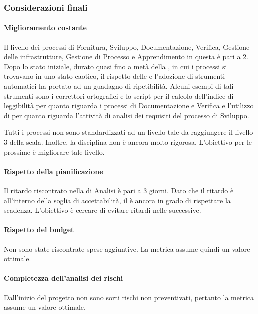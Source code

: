 		\subsubsection{Considerazioni finali}
			\paragraph{Miglioramento costante}
			\label{RMC}
				Il livello  dei processi di Fornitura, Sviluppo, Documentazione, Verifica, Gestione delle infrastrutture, Gestione di Processo e Apprendimento in questa  è pari a 2. Dopo lo stato iniziale, durato quasi fino a metà della , in cui i processi si trovavano in uno stato caotico, il rispetto delle \ndpv{} e l'adozione di strumenti automatici ha portato ad un guadagno di ripetibilità. Alcuni esempi di tali strumenti sono i correttori ortografici e lo script per il calcolo dell'indice di leggibilità per quanto riguarda i processi di Documentazione e Verifica e l'utilizzo di  per quanto riguarda l'attività di analisi dei requisiti del processo di Sviluppo.
				
				
				Tutti i processi non sono standardizzati ad un livello tale da raggiungere il livello 3 della scala. Inoltre, la disciplina non è ancora molto rigorosa. L'obiettivo per le prossime  è migliorare tale livello.
				
			\paragraph{Rispetto della pianificazione}
			\label{RRDP}
				Il ritardo riscontrato nella  di Analisi è pari a 3 giorni. Dato che il ritardo è all'interno della soglia di accettabilità, il  è ancora in grado di rispettare la scadenza. L'obiettivo è cercare di evitare ritardi nelle  successive.
			
			\paragraph{Rispetto del budget}
			\label{RRDB}
				Non sono state riscontrate spese aggiuntive. La metrica assume quindi un valore ottimale.
			
			\paragraph{Completezza dell'analisi dei rischi}
			\label{RCDADR}
				Dall'inizio del progetto non sono sorti rischi non preventivati, pertanto la metrica assume un valore ottimale.
			
